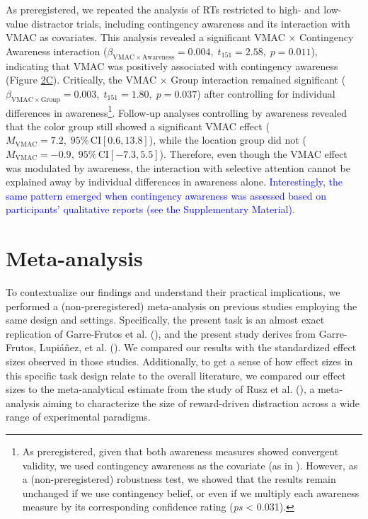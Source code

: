 \documentclass[
  man,
  floatsintext,
  longtable,
  nolmodern,
  notxfonts,
  notimes,
  mask,
  colorlinks=true,linkcolor=blue,citecolor=blue,urlcolor=blue]{apa7}
\begin{document}
As preregistered, we repeated the analysis of RTs restricted to high-
and low-value distractor trials, including contingency awareness and its
interaction with VMAC as covariates. This analysis revealed a
significant VMAC \(\times\) Contingency Awareness interaction
(\(\beta_{\mathrm{VMAC} \times \mathrm{Awareness}} = 0.004, \; t_{151} = 2.58, \; p = 0.011\)),
indicating that VMAC was positively associated with contingency
awareness (Figure \hyperref[fig-2]{2C}). Critically, the VMAC \(\times\)
Group interaction remained significant
(\(\beta_{\mathrm{VMAC} \times \mathrm{Group}} = 0.003, \; t_{151} = 1.80, \; p = 0.037\))
after controlling for individual differences in awareness\footnote{As
  preregistered, given that both awareness measures showed convergent
  validity, we used contingency awareness as the covariate (as in
  ). However, as a (non-preregistered) robustness test, we showed
  that the results remain unchanged if we use contingency belief, or
  even if we multiply each awareness measure by its corresponding
  confidence rating (\emph{ps} \textless{} 0.031).}. Follow-up analyses
controlling by awareness revealed that the color group still showed a
significant VMAC effect
(\(M_{\mathrm{VMAC}} = 7.2,\;95\%\,\mathrm{CI}[0.6, 13.8]\)), while the
location group did not
(\(M_{\mathrm{VMAC}} = -0.9,\;95\%\,\mathrm{CI}[-7.3, 5.5]\)).
Therefore, even though the VMAC effect was modulated by awareness, the
interaction with selective attention cannot be explained away by
individual differences in awareness alone.
\textcolor{blue}{Interestingly, the same pattern emerged when
contingency awareness was assessed based on participants' qualitative
reports (see the Supplementary Material).}

\section{Meta-analysis}\label{meta-analysis}

To contextualize our findings and understand their practical
implications, we performed a (non-preregistered) meta-analysis on
previous studies employing the same design and settings. Specifically,
the present task is an almost exact replication of Garre-Frutos et al.
(), and the present study derives
from Garre-Frutos, Lupiáñez, et al.
(). We compared our results with
the standardized effect sizes observed in those studies. Additionally,
to get a sense of how effect sizes in this specific task design relate
to the overall literature, we compared our effect sizes to the
meta-analytical estimate from the study of Rusz et al.
(), a meta-analysis aiming to characterize
the size of reward-driven distraction across a wide range of
experimental paradigms.
\end{document}
